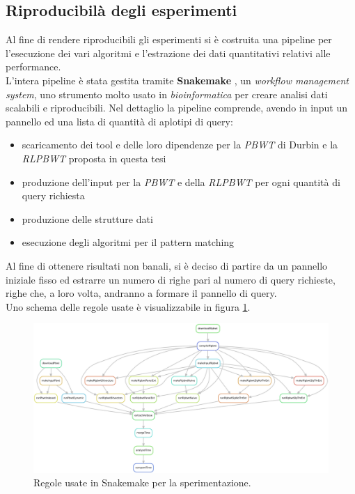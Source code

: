 \subsection{Riproducibilà degli esperimenti}
Al fine di rendere riproducibili gli esperimenti si è costruita una pipeline
per l'esecuzione dei vari algoritmi e l'estrazione dei dati quantitativi
relativi alle performance.\\
L'intera pipeline è stata gestita tramite \textbf{Snakemake} \cite{snakemake},
un \textit{workflow management system}, uno strumento molto usato in
\textit{bioinformatica} per creare analisi dati scalabili e riproducibili. Nel
dettaglio la pipeline comprende, avendo in input un pannello ed una lista di
quantità di aplotipi di query:
\begin{itemize}
  \item scaricamento dei tool e delle loro dipendenze per la \textit{PBWT} di
  Durbin e la \textit{RLPBWT} proposta in questa tesi
  \item produzione dell'input per la \textit{PBWT} e della \textit{RLPBWT} per
  ogni quantità di query richiesta
  \item produzione delle strutture dati
  \item esecuzione degli algoritmi per il pattern matching
\end{itemize}
Al fine di ottenere risultati non banali, si è deciso di partire da
un pannello iniziale fisso ed estrarre un numero di righe pari al numero di
query richieste, righe che, a loro volta, andranno a formare il pannello di
query.\\ 
Uno schema delle regole usate è visualizzabile in figura \ref{fig:snake}.
\begin{figure}
  \centering
  \includegraphics[width=\textwidth]{img/rules.pdf}
  \caption{Regole usate in Snakemake per la sperimentazione.}
  \label{fig:snake}
\end{figure}